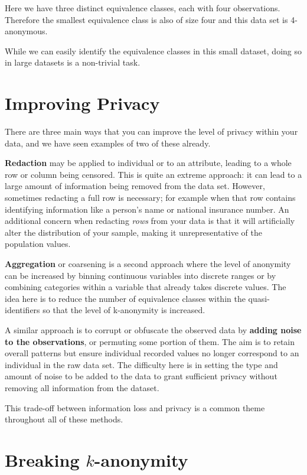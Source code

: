 \documentclass[
  12pt,
]{book}
\begin{document}
Here we have three distinct equivalence classes, each with four observations. Therefore the smallest equivalence class is also of size four and this data set is 4-anonymous.

While we can easily identify the equivalence classes in this small dataset, doing so in large datasets is a non-trivial task.

\hypertarget{improving-privacy}{%
\section{Improving Privacy}\label{improving-privacy}}

There are three main ways that you can improve the level of privacy within your data, and we have seen examples of two of these already.

\textbf{Redaction} may be applied to individual or to an attribute, leading to a whole row or column being censored. This is quite an extreme approach: it can lead to a large amount of information being removed from the data set. However, sometimes redacting a full row is necessary; for example when that row contains identifying information like a person's name or national insurance number. An additional concern when redacting \emph{rows} from your data is that it will artificially alter the distribution of your sample, making it unrepresentative of the population values.

\textbf{Aggregation} or coarsening is a second approach where the level of anonymity can be increased by binning continuous variables into discrete ranges or by combining categories within a variable that already takes discrete values. The idea here is to reduce the number of equivalence classes within the quasi-identifiers so that the level of k-anonymity is increased.

A similar approach is to corrupt or obfuscate the observed data by \textbf{adding noise to the observations}, or permuting some portion of them. The aim is to retain overall patterns but ensure individual recorded values no longer correspond to an individual in the raw data set. The difficulty here is in setting the type and amount of noise to be added to the data to grant sufficient privacy without removing all information from the dataset.

This trade-off between information loss and privacy is a common theme throughout all of these methods.

\hypertarget{breaking-k-anonymity}{%
\section{\texorpdfstring{Breaking \(k\)-anonymity}{Breaking k-anonymity}}\label{breaking-k-anonymity}}
\end{document}
